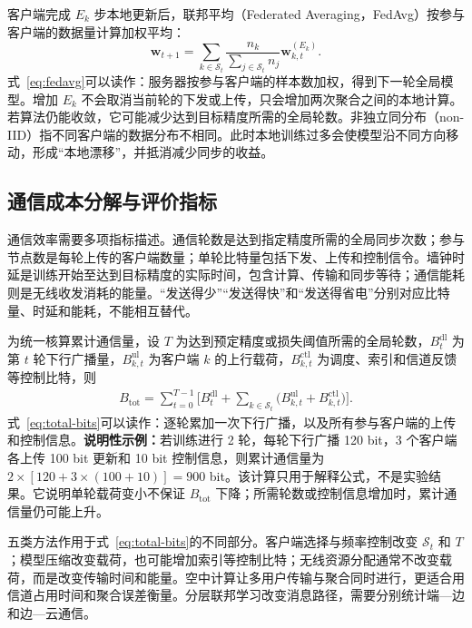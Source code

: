 客户端完成 \(E_k\) 步本地更新后，联邦平均（Federated Averaging，FedAvg）按参与客户端的数据量计算加权平均\cite{McMahan2017FedAvg}：
\begin{equation}\label{eq:fedavg}
  \bm w_{t+1}
  =\sum_{k\in\mathcal S_t}
   \frac{n_k}{\sum_{j\in\mathcal S_t}n_j}
   \bm w_{k,t}^{(E_k)} .
\end{equation}
式~\eqref{eq:fedavg}可以读作：服务器按参与客户端的样本数加权，得到下一轮全局模型。增加 \(E_k\) 不会取消当前轮的下发或上传，只会增加两次聚合之间的本地计算。若算法仍能收敛，它可能减少达到目标精度所需的全局轮数。非独立同分布（non-IID）指不同客户端的数据分布不相同。此时本地训练过多会使模型沿不同方向移动，形成“本地漂移”，并抵消减少同步的收益\cite{McMahan2017FedAvg,Wang2019AdaptiveFL}。

\subsection{通信成本分解与评价指标}\label{subsec:communication-metrics}

通信效率需要多项指标描述。通信轮数是达到指定精度所需的全局同步次数；参与节点数是每轮上传的客户端数量；单轮比特量包括下发、上传和控制信令。墙钟时延是训练开始至达到目标精度的实际时间，包含计算、传输和同步等待；通信能耗则是无线收发消耗的能量。“发送得少”“发送得快”和“发送得省电”分别对应比特量、时延和能耗，不能相互替代。

为统一核算累计通信量，设 \(T\) 为达到预定精度或损失阈值所需的全局轮数，\(B_t^{\mathrm{dl}}\) 为第 \(t\) 轮下行广播量，\(B_{k,t}^{\mathrm{ul}}\) 为客户端 \(k\) 的上行载荷，\(B_{k,t}^{\mathrm{ctl}}\) 为调度、索引和信道反馈等控制比特，则
\begin{equation}\label{eq:total-bits}
  \begin{split}
    B_{\mathrm{tot}}=\sum_{t=0}^{T-1}\biggl[
      B_t^{\mathrm{dl}}+\sum_{k\in\mathcal S_t}
      \bigl(B_{k,t}^{\mathrm{ul}}+B_{k,t}^{\mathrm{ctl}}\bigr)
    \biggr].
  \end{split}
\end{equation}
式~\eqref{eq:total-bits}可以读作：逐轮累加一次下行广播，以及所有参与客户端的上传和控制信息。\textbf{说明性示例：}若训练进行 2 轮，每轮下行广播 120 bit，3 个客户端各上传 100 bit 更新和 10 bit 控制信息，则累计通信量为 \(2\times[120+3\times(100+10)]=900\) bit。该计算只用于解释公式，不是实验结果。它说明单轮载荷变小不保证 \(B_{\mathrm{tot}}\) 下降；所需轮数或控制信息增加时，累计通信量仍可能上升\cite{Ge2025EfficientFLSurvey}。

五类方法作用于式~\eqref{eq:total-bits}的不同部分。客户端选择与频率控制改变 \(\mathcal S_t\) 和 \(T\)；模型压缩改变载荷，也可能增加索引等控制比特；无线资源分配通常不改变载荷，而是改变传输时间和能量。空中计算让多用户传输与聚合同时进行，更适合用信道占用时间和聚合误差衡量\cite{Zhang2023EdgeFLSurvey}。分层联邦学习改变消息路径，需要分别统计端—边和边—云通信。

